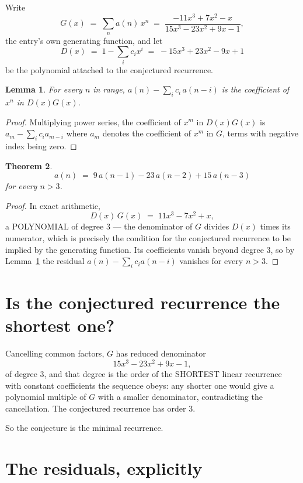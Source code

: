 \documentclass[11pt,a4paper]{article}
\theoremstyle{plain}
\newtheorem{theorem}{Theorem}
\newtheorem{lemma}[theorem]{Lemma}
\theoremstyle{definition}
\begin{document}
Write
\[
G(x)\;=\;\sum_{n}a(n)\,x^{n}\;=\;\frac{- 11 x^{3} + 7 x^{2} - x}{15 x^{3} - 23 x^{2} + 9 x - 1},
\]
the entry's own generating function, and let
\[
D(x)\;=\;1-\sum_i c_i x^{i}\;=\;- 15 x^{3} + 23 x^{2} - 9 x + 1
\]
be the polynomial attached to the conjectured recurrence.

\begin{lemma}\label{lem:key}
For every $n$ in range, $a(n)-\sum_i c_i\,a(n-i)$ is the coefficient of $x^{n}$ in
$D(x)G(x)$.
\end{lemma}

\begin{proof}
Multiplying power series, the coefficient of $x^{m}$ in $D(x)G(x)$ is
$a_m-\sum_i c_i a_{m-i}$ where $a_m$ denotes the coefficient of $x^{m}$ in $G$, terms with
negative index being zero.
\end{proof}

\begin{theorem}
\[
a(n)\;=\;9\,a(n-1) - 23\,a(n-2) + 15\,a(n-3)
\]
for every $n>3$.
\end{theorem}

\begin{proof}
In exact arithmetic,
\[
D(x)\,G(x)\;=\;11 x^{3} - 7 x^{2} + x,
\]
a POLYNOMIAL of degree $3$ --- the denominator of $G$ divides $D(x)$ times its numerator,
which is precisely the condition for the conjectured recurrence to be implied by the
generating function. Its coefficients vanish beyond degree $3$, so by
Lemma~\ref{lem:key} the residual $a(n)-\sum_ic_ia(n-i)$ vanishes for every
$n>3$.
\end{proof}

\section{Is the conjectured recurrence the shortest one?}

Cancelling common factors, $G$ has reduced denominator
\[
15 x^{3} - 23 x^{2} + 9 x - 1,
\]
of degree $3$, and that degree is the order of the SHORTEST linear recurrence with
constant coefficients the sequence obeys: any shorter one would give a polynomial multiple of
$G$ with a smaller denominator, contradicting the cancellation. The conjectured recurrence has
order $3$.

So the conjecture is the minimal recurrence.

\section{The residuals, explicitly}
\end{document}
